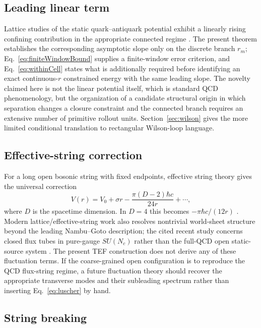 \documentclass[10pt]{article}
\begin{document}
\subsection{Leading linear term}

Lattice studies of the static quark--antiquark potential exhibit a linearly rising confining contribution in the appropriate connected regime \cite{BaliSchilling1992}. The present theorem establishes the corresponding asymptotic slope only on the discrete branch $r_m$; Eq.~\eqref{eq:finiteWindowBound} supplies a finite-window error criterion, and Eq.~\eqref{eq:withinCell} states what is additionally required before identifying an exact continuous-$r$ constrained energy with the same leading slope. The novelty claimed here is not the linear potential itself, which is standard QCD phenomenology, but the organization of a candidate structural origin in which separation changes a closure constraint and the connected branch requires an extensive number of primitive rollout units. Section~\ref{sec:wilson} gives the more limited conditional translation to rectangular Wilson-loop language.

\subsection{Effective-string correction}

For a long open bosonic string with fixed endpoints, effective string theory gives the universal correction
\begin{equation}
V(r)=V_0+\sigma r-\frac{\pi(D-2)\hbar c}{24r}+\cdots,
\label{eq:luscher}
\end{equation}
where $D$ is the spacetime dimension. In $D=4$ this becomes $-\pi\hbar c/(12r)$ \cite{LuscherWeisz2002}. Modern lattice/effective-string work also resolves nontrivial world-sheet structure beyond the leading Nambu--Goto description; the cited recent study concerns closed flux tubes in pure-gauge $SU(N_c)$ rather than the full-QCD open static-source system \cite{Athenodorou2025}. The present TEF construction does not derive any of these fluctuation terms. If the coarse-grained open configuration is to reproduce the QCD flux-string regime, a future fluctuation theory should recover the appropriate transverse modes and their subleading spectrum rather than inserting Eq.~\eqref{eq:luscher} by hand.

\subsection{String breaking}
\end{document}
